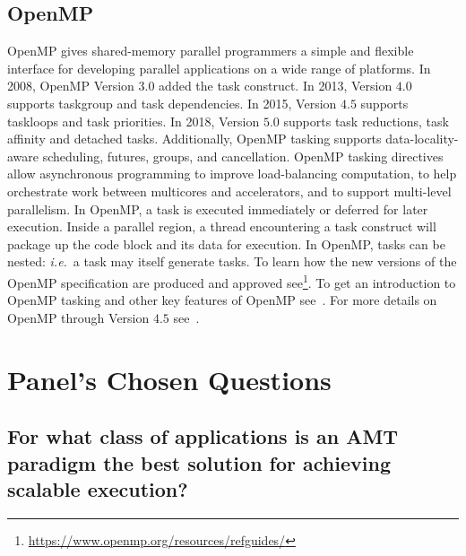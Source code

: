 \documentclass[12pt,letterpaper]{article}
\begin{document}
\subsection{OpenMP}
\label{sec:openmp}
OpenMP gives shared-memory parallel programmers a simple and flexible interface for developing parallel applications on a wide range of platforms. In 2008, OpenMP Version 3.0 added the task construct. In 2013, Version $4.0$ supports taskgroup and task dependencies. In 2015, Version $4.5$ supports taskloops and task priorities. In 2018, Version $5.0$ supports task reductions, task affinity and detached tasks. Additionally, OpenMP tasking supports data-locality-aware scheduling, futures, groups, and cancellation. OpenMP tasking directives allow asynchronous programming to improve load-balancing computation, to help orchestrate work between multicores and accelerators, and to support multi-level parallelism. In OpenMP, a task is executed immediately or deferred for later execution. Inside a parallel region, a thread encountering a task construct will package up the code block and its data for execution. In OpenMP, tasks can be nested: \emph{i.e.}\ a task may itself generate tasks. To learn how the new versions of the OpenMP specification are produced and approved see\footnote{\url{https://www.openmp.org/resources/refguides/}}. To get an introduction to OpenMP tasking and other key features of OpenMP see~\cite{mattson2019openmp}. For more details on OpenMP through Version $4.5$ see~\cite{van2017using}. 


\section{Panel’s Chosen Questions}
\label{sec:questions}

\subsection{For what class of applications is an AMT paradigm the best solution for achieving scalable execution?}
\end{document}

